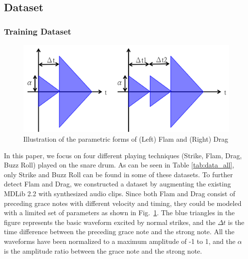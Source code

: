 \documentclass{article}
\begin{document}
{{{{{{{{{%
%

\subsection{Dataset}
\subsubsection{Training Dataset}
\label{sssec:trainData}

\begin{figure} 
\centering
\includegraphics[width = 6.0 cm]{./figures/signal_model.png}
\caption{Illustration of the parametric forms of (Left) Flam and (Right) Drag}
\label{sigModel}
\end{figure}

In this paper, we focus on four different playing techniques (Strike, Flam, Drag, Buzz Roll) played on the snare drum. As can be seen in Table \ref{tab:data_all}, only Strike and Buzz Roll can be found in some of these datasets. To further detect Flam and Drag, we constructed a dataset by augmenting the existing MDLib 2.2 \cite{Prockup2013} with synthesized audio clips. Since both Flam and Drag consist of preceding grace notes with different velocity and timing, they could be modeled with a limited set of parameters as shown in Fig.~\ref{sigModel}. The blue triangles in the figure represents the basic waveform excited by normal strikes, and the $\Delta t$ is the time difference between the preceding grace note and the strong note. All the waveforms have been normalized to a maximum amplitude of -1 to 1, and the $\alpha$ is the amplitude ratio between the grace note and the strong note. 

}}}}}}}}}
\end{document}
